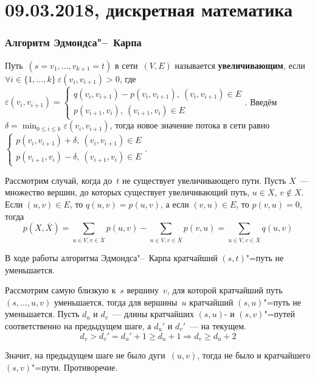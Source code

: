 \chapter{09.03.2018, дискретная математика}
\subsection{Алгоритм Эдмондса"--~Карпа}
Путь~$(s = v_1, \ldots, v_{k+1} = t)$ в сети~$(V, E)$ называется \textbf{увеличивающим}, если $\forall i \in \{ 1, \ldots, k \} \ \varepsilon(v_i, v_{i+1}) > 0$, где $\varepsilon(v_i, v_{i+1}) = \begin{cases}
q(v_i, v_{i+1}) - p(v_i, v_{i+1}), \ (v_i, v_{i+1}) \in E \\
p(v_{i+1}, v_i), \ (v_{i+1}, v_i) \in E
\end{cases}$.
Введём $\displaystyle \delta = \min_{0 \leqslant i \leqslant k} \varepsilon(v_i, v_{i+1})$, тогда новое значение потока в сети равно $\begin{cases}
p(v_i, v_{i+1}) + \delta, \ (v_i, v_{i+1}) \in E \\
p(v_{i+1}, v_i) - \delta, \ (v_{i+1}, v_i) \in E
\end{cases}$.

Рассмотрим случай, когда до~$t$ не существует увеличивающего пути.
Пусть $X$~--- множество вершин, до которых существует увеличивающий путь, $u \in X$, $v \notin X$.
Если $(u, v) \in E$, то $q(u, v) = p(u, v)$, а если $(v, u) \in E$, то $p(v, u) = 0$, тогда
\begin{equation*}
p(X, \overline X) =
\sum_{u \in V, v \in \overline X} p(u, v) - \sum_{u \in V, v \in \overline X} p(v, u) =
\sum_{u \in V, v \in \overline X} q(u, v)
\end{equation*}

\begin{lemma}
В ходе работы алгоритма Эдмондса"--~Карпа кратчайший $(s, t)$"=путь не уменьшается.
\end{lemma}
\begin{proofcontra}
Рассмотрим самую близкую к~$s$ вершину~$v$, для которой кратчайший путь~$(s, \ldots, u, v)$ уменьшается, тогда для вершины~$u$ кратчайший $(s, u)$"=путь не уменьшается.
Пусть $d_u$ и $d_v$~--- длины кратчайших $(s, u)$- и $(s, v)$"=путей соответственно на предыдущем шаге, а $d_u'$ и $d_v'$~--- на текущем.
\begin{equation*}
d_v > d_v' = d_u' + 1 \geqslant d_u + 1 \Rightarrow d_v \geqslant d_u + 2
\end{equation*}

Значит, на предыдущем шаге не было дуги~$(u, v)$, тогда не было и кратчайшего $(s, v)$"=пути.
Противоречие.
\end{proofcontra}

